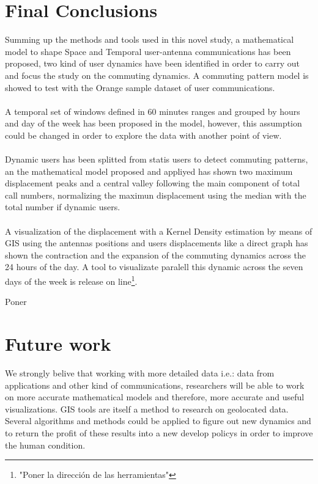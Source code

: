 \newpage
\section{Final Conclusions}

Summing up the methods and tools used in this novel study, a mathematical model to shape Space and Temporal user-antenna communications has been proposed, two kind of user dynamics have been identified in order to carry out and focus the study on the commuting dynamics. A commuting pattern model is showed to test with the Orange sample dataset of user communications.
\\
\\
A temporal set of windows defined in 60 minutes ranges and grouped by hours and day of the week has been proposed in the model, however, this assumption could be changed in order to explore the data with another point of view.
\\
\\
Dynamic users has been splitted from statis users to detect commuting patterns, an the mathematical model proposed and appliyed has shown two maximum displacement peaks and a central valley following the main component of total call numbers, normalizing the maximun displacement using the median with the total number if dynamic users.
\\
\\
A visualization of the displacement with a Kernel Density estimation by means of GIS using the antennas positions and users displacements like a direct graph has shown the contraction and the expansion of the commuting dynamics across the 24 hours of the day.  A tool to visualizate paralell this dynamic  across the seven days of the week is release on line\footnote{"Poner la dirección de las herramientas"}.

{\color{red} Poner }



\section{Future work}

We strongly belive that working with more detailed data i.e.: data from applications and other kind of communications, researchers will be able to work on more accurate mathematical models and therefore, more accurate and useful visualizations. GIS tools are itself a method to research on geolocated data. Several algorithms and methods could be applied to figure out new dynamics and to return the profit of these results into a new develop policys in order to improve the human condition.